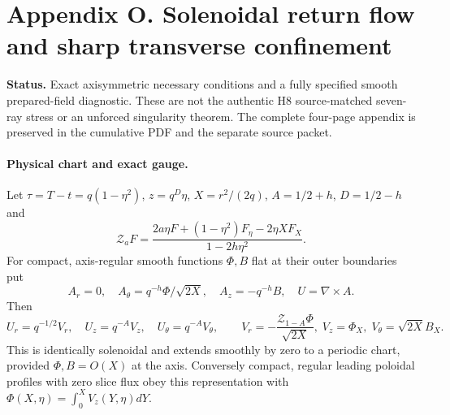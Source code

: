 \clearpage
\section*{Appendix O. Solenoidal return flow and sharp transverse confinement}
\noindent\textbf{Status.} Exact axisymmetric necessary conditions and a fully specified smooth prepared-field diagnostic. These are not the authentic H8 source-matched seven-ray stress or an unforced singularity theorem. The complete four-page appendix is preserved in the cumulative PDF and the separate source packet.
\paragraph{Physical chart and exact gauge.}
Let $\tau=T-t=q(1-\eta^2)$, $z=q^D\eta$, $X=r^2/(2q)$, $A=1/2+h$, $D=1/2-h$ and
\[
\mathcal Z_a F=\frac{2a\eta F+(1-\eta^2)F_\eta-2\eta XF_X}{1-2h\eta^2}.
\]
For compact, axis-regular smooth functions $\Phi,B$ flat at their outer boundaries put
\[
A_r=0,\quad A_\theta=q^{-h}\Phi/\sqrt{2X},\quad A_z=-q^{-h}B,\quad U=\nabla\times A.
\]
Then
\[
U_r=q^{-1/2}V_r,\quad U_z=q^{-A}V_z,\quad U_\theta=q^{-A}V_\theta,\qquad
V_r=-\frac{\mathcal Z_{1-A}\Phi}{\sqrt{2X}},\;
V_z=\Phi_X,\;
V_\theta=\sqrt{2X}B_X.
\]
This is identically solenoidal and extends smoothly by zero to a periodic chart, provided $\Phi,B=O(X)$ at the axis. Conversely compact, regular leading poloidal profiles with zero slice flux obey this representation with $\Phi(X,\eta)=\int_0^X V_z(Y,\eta)dY$.
